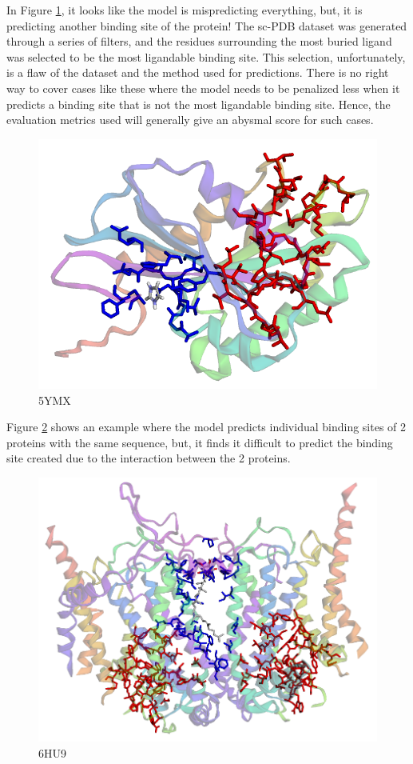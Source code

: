 \documentclass[journal=jacsat,manuscript=article]{achemso}
\begin{document}
In Figure \ref{fig:5ymx}, it looks like the model is mispredicting everything, but, it is predicting another binding site of the protein! The sc-PDB dataset was generated through a series of filters, and the residues surrounding the most buried ligand was selected to be the most ligandable binding site. This selection, unfortunately, is a flaw of the dataset and the method used for predictions. There is no right way to cover cases like these where the model needs to be penalized less when it predicts a binding site that is not the most ligandable binding site. Hence, the evaluation metrics used will generally give an abysmal score for such cases.
\begin{figure}
    \centering
    \noindent\includegraphics[scale=0.4]{5ymx.png}
    \caption{\centering 5YMX}
    \label{fig:5ymx}
\end{figure}

Figure \ref{fig:6hu9} shows an example where the model predicts individual binding sites of 2 proteins with the same sequence, but, it finds it difficult to predict the binding site created due to the interaction between the 2 proteins.
\begin{figure}
    \centering
    \noindent\includegraphics[scale=0.35]{6hu9.png}
    \caption{\centering 6HU9}
    \label{fig:6hu9}
\end{figure}
\end{document}
